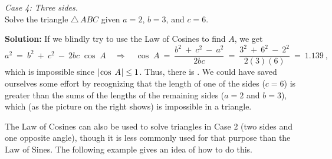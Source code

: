 \begin{exmp}\label{exmp:case4fail}
\noindent \emph{Case 4: Three sides.}\\Solve the triangle $\triangle\,ABC$ given
 $a = 2$, $b = 3$, and $c = 6$.\vspace{1mm}
 \par\noindent\textbf{Solution:} If we blindly try to use the Law of Cosines to find $A$, we get
 \begin{displaymath}
  a^2 ~ = ~ b^2 ~ + ~ c^2 ~ - ~ 2bc\;\cos\;A \quad\Rightarrow\quad \cos\;A ~=~
   \frac{b^2 ~ + ~ c^2 ~-~ a^2}{2bc} ~=~ \frac{3^2 ~ + ~ 6^2 ~-~ 2^2}{2(3)(6)} ~=~ 1.139 ~,
 \end{displaymath}
 which is impossible since $\lvert\mspace{1mu}\cos\;A\mspace{1mu}\rvert \le 1$. Thus, there is \;.
 We could have saved ourselves some effort by recognizing that the length of one of the
 sides ($c=6$) is greater than the sums of the lengths of the remaining sides ($a=2$ and
 $b=3$), which (as the picture on the right shows) is impossible in a triangle.
\end{exmp}\vspace{-2mm}
\divider
\vspace{3mm}

The Law of Cosines can also be used to solve triangles in Case 2 (two sides and one opposite angle),
though it is less commonly used for that purpose than the Law of Sines. The following example gives
an idea of how to do this.

